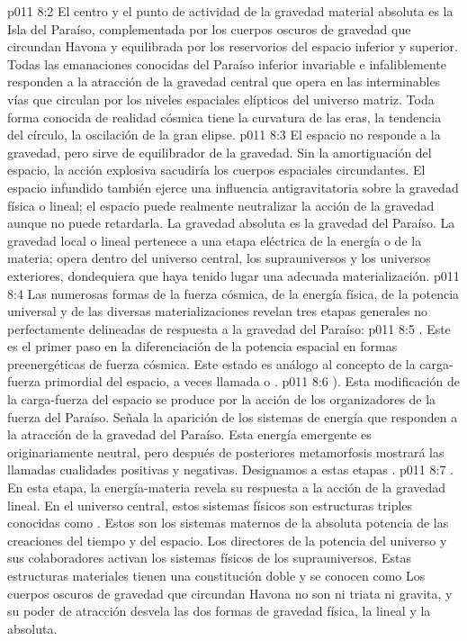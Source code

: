 \vs p011 8:2 El centro y el punto de actividad de la gravedad material absoluta es la Isla del Paraíso, complementada por los cuerpos oscuros de gravedad que circundan Havona y equilibrada por los reservorios del espacio inferior y superior. Todas las emanaciones conocidas del Paraíso inferior invariable e infaliblemente responden a la atracción de la gravedad central que opera en las interminables vías que circulan por los niveles espaciales elípticos del universo matriz. Toda forma conocida de realidad cósmica tiene la curvatura de las eras, la tendencia del círculo, la oscilación de la gran elipse.
\vs p011 8:3 El espacio no responde a la gravedad, pero sirve de equilibrador de la gravedad. Sin la amortiguación del espacio, la acción explosiva sacudiría los cuerpos espaciales circundantes. El espacio infundido también ejerce una influencia antigravitatoria sobre la gravedad física o lineal; el espacio puede realmente neutralizar la acción de la gravedad aunque no puede retardarla. La gravedad absoluta es la gravedad del Paraíso. La gravedad local o lineal pertenece a una etapa eléctrica de la energía o de la materia; opera dentro del universo central, los suprauniversos y los universos exteriores, dondequiera que haya tenido lugar una adecuada materialización.
\vs p011 8:4 \pc Las numerosas formas de la fuerza cósmica, de la energía física, de la potencia universal y de las diversas materializaciones revelan tres etapas generales no perfectamente delineadas de respuesta a la gravedad del Paraíso:
\vs p011 8:5 . Este es el primer paso en la diferenciación de la potencia espacial en formas preenergéticas de fuerza cósmica. Este estado es análogo al concepto de la carga\hyp{}fuerza primordial del espacio, a veces llamada  o .
\vs p011 8:6 ). Esta modificación de la carga\hyp{}fuerza del espacio se produce por la acción de los organizadores de la fuerza del Paraíso. Señala la aparición de los sistemas de energía que responden a la atracción de la gravedad del Paraíso. Esta energía emergente es originariamente neutral, pero después de posteriores metamorfosis mostrará las llamadas cualidades positivas y negativas. Designamos a estas etapas .
\vs p011 8:7 . En esta etapa, la energía\hyp{}materia revela su respuesta a la acción de la gravedad lineal. En el universo central, estos sistemas físicos son estructuras triples conocidas como . Estos son los sistemas maternos de la absoluta potencia de las creaciones del tiempo y del espacio. Los directores de la potencia del universo y sus colaboradores activan los sistemas físicos de los suprauniversos. Estas estructuras materiales tienen una constitución doble y se conocen como  Los cuerpos oscuros de gravedad que circundan Havona no son ni triata ni gravita, y su poder de atracción desvela las dos formas de gravedad física, la lineal y la absoluta.
